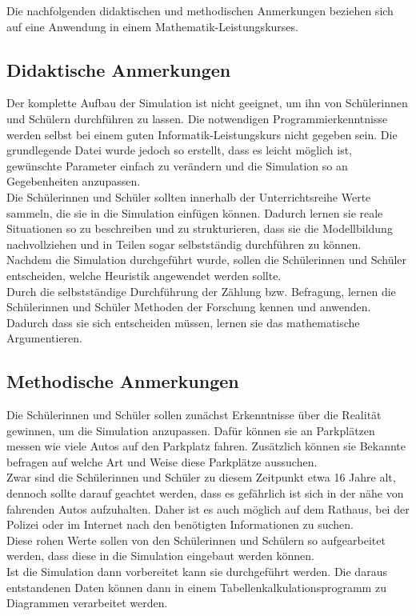 Die nachfolgenden didaktischen und methodischen Anmerkungen beziehen sich auf eine Anwendung in einem Mathematik-Leistungskurses.

\subsection{Didaktische Anmerkungen}

Der komplette Aufbau der Simulation ist nicht geeignet, um ihn von Schülerinnen und Schülern durchführen zu lassen. Die notwendigen Programmierkenntnisse werden selbst bei einem guten Informatik-Leistungskurs nicht gegeben sein. Die grundlegende Datei wurde jedoch so erstellt, dass es leicht möglich ist, gewünschte Parameter einfach zu verändern und die Simulation so an Gegebenheiten anzupassen.\\
Die Schülerinnen und Schüler sollten innerhalb der Unterrichtsreihe Werte sammeln, die sie in die Simulation einfügen können. Dadurch lernen sie reale Situationen so zu beschreiben und zu strukturieren, dass sie die Modellbildung nachvollziehen und in Teilen sogar selbstständig durchführen zu können.\\
Nachdem die Simulation durchgeführt wurde, sollen die Schülerinnen und Schüler entscheiden, welche Heuristik angewendet werden sollte. \\
Durch die selbstständige Durchführung der Zählung bzw. Befragung, lernen die Schülerinnen und Schüler Methoden der Forschung kennen und anwenden. Dadurch dass sie sich entscheiden müssen, lernen sie das mathematische Argumentieren.

\subsection{Methodische Anmerkungen}

Die Schülerinnen und Schüler sollen zunächst Erkenntnisse über die Realität gewinnen, um die Simulation anzupassen. Dafür können sie an Parkplätzen messen wie viele Autos auf den Parkplatz fahren. Zusätzlich können sie Bekannte befragen auf welche Art und Weise diese Parkplätze aussuchen.\\
Zwar sind die Schülerinnen und Schüler zu diesem Zeitpunkt etwa 16 Jahre alt, dennoch sollte darauf geachtet werden, dass es gefährlich ist sich in der nähe von fahrenden Autos aufzuhalten. Daher ist es auch möglich auf dem Rathaus, bei der Polizei oder im Internet nach den benötigten Informationen zu suchen. \\
Diese rohen Werte sollen von den Schülerinnen und Schülern so aufgearbeitet werden, dass diese in die Simulation eingebaut werden können.\\
 Ist die Simulation dann vorbereitet kann sie durchgeführt werden. Die daraus entstandenen Daten können dann in einem Tabellenkalkulationsprogramm zu Diagrammen verarbeitet werden. 

